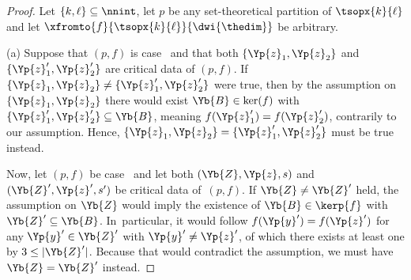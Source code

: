 \documentclass[pdftex]{sigma}
\numberwithin{equation}{section}
\begin{document}
\begin{proof}
  \newcommand{\inlen}{k}
  \newcommand{\outlen}{\ell}
  \newcommand{\theind}{f}
  \newcommand{\theindx}[1]{f(#1)}
  \newcommand{\thepoint}{\Yp{z}}
  \newcommand{\thevalue}{s}
  \newcommand{\thepartition}{p}
  \newcommand{\thelong}{\Yb{Z}}
  \newcommand{\firstspecialpoint}{\Yp{z}_1}
  \newcommand{\secondspecialpoint}{\Yp{z}_2}
  \newcommand{\anypoint}{\Yp{y}}
  \newcommand{\someblock}{\Yb{B}}
  \newcommand{\anyblock}{\Yb{A}}
  \newcommand{\alternativefirstspecialpoint}{\Yp{z}_1'}
  \newcommand{\alternativesecondspecialpoint}{\Yp{z}_2'}
  \newcommand{\alternativelong}{\Yb{Z}'}
  \newcommand{\alternativepoint}{\Yp{z}'}
  \newcommand{\alternativevalue}{s'}
  \newcommand{\alternativeanypoint}{\Yp{y}'}
  Let $\{\inlen,\outlen\}\subseteq \nnint$, let $\thepartition$ be any set-theoretical partition of $\tsopx{\inlen}{\outlen}$ and let $\xfromto{\theind}{\tsopx{\inlen}{\outlen}}{\dwi{\thedim}}$ be arbitrary.

  (a)
  Suppose that $(\thepartition,\theind)$ is case~\scenariotwo{} and that both $\{\firstspecialpoint,\secondspecialpoint\}$ and  $\{\alternativefirstspecialpoint,\alternativesecondspecialpoint\}$ are critical data of $(\thepartition,\theind)$. If $\{\firstspecialpoint,\secondspecialpoint\}\neq \{\alternativefirstspecialpoint,\alternativesecondspecialpoint\}$ were true, then by the assumption on $\{\firstspecialpoint,\secondspecialpoint\}$ there would exist $\someblock\in\ker(\theind)$ with $\{\alternativefirstspecialpoint,\alternativesecondspecialpoint\}\subseteq \someblock$, meaning $\theind(\alternativefirstspecialpoint)=\theind(\alternativesecondspecialpoint)$, contrarily to our assumption. Hence, $\{\firstspecialpoint,\secondspecialpoint\}= \{\alternativefirstspecialpoint,\alternativesecondspecialpoint\}$ must be true instead.

  Now, let $(\thepartition,\theind)$ be case~\scenariothree{} and let both $(\thelong,\thepoint,\thevalue)$ and $(\alternativelong,\alternativepoint,\alternativevalue)$ be critical data of~$(\thepartition,\theind)$.
 If $\thelong\neq\alternativelong$ held, the assumption on $\thelong$ would imply the existence of $\someblock\in\kerp{\theind}$ with $\alternativelong\subseteq \someblock$. In~particular, it would follow $\theind(\alternativeanypoint)=\theind(\alternativepoint)$ for any $\alternativeanypoint\in \alternativelong$ with $\alternativeanypoint\neq\alternativepoint$, of which there exists at least one by $3\leq |\alternativelong|$. Because that would contradict the assumption, we must have $\thelong=\alternativelong$ instead.


\end{proof}
\end{document}
